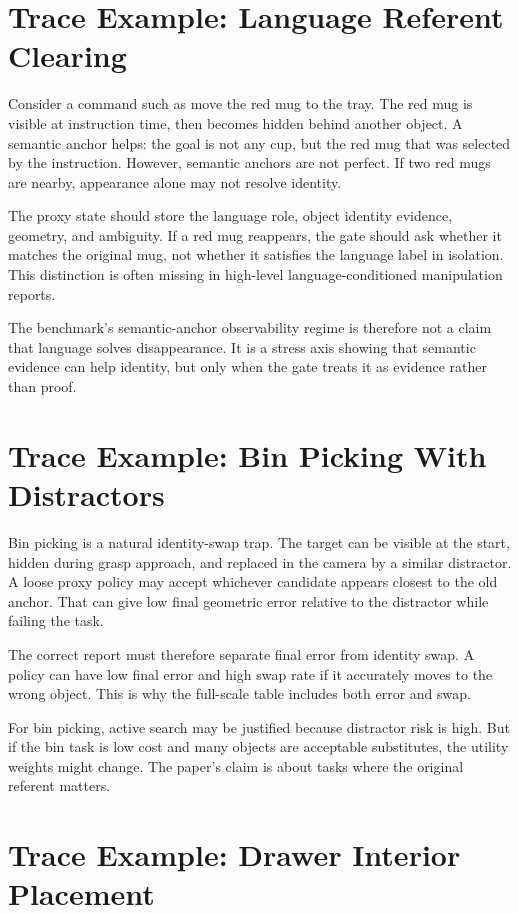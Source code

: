 \section{Trace Example: Language Referent Clearing}

Consider a command such as move the red mug to the tray. The red mug is visible at instruction time, then becomes hidden behind another object. A semantic anchor helps: the goal is not any cup, but the red mug that was selected by the instruction. However, semantic anchors are not perfect. If two red mugs are nearby, appearance alone may not resolve identity.

The proxy state should store the language role, object identity evidence, geometry, and ambiguity. If a red mug reappears, the gate should ask whether it matches the original mug, not whether it satisfies the language label in isolation. This distinction is often missing in high-level language-conditioned manipulation reports.

The benchmark's semantic-anchor observability regime is therefore not a claim that language solves disappearance. It is a stress axis showing that semantic evidence can help identity, but only when the gate treats it as evidence rather than proof.

\section{Trace Example: Bin Picking With Distractors}

Bin picking is a natural identity-swap trap. The target can be visible at the start, hidden during grasp approach, and replaced in the camera by a similar distractor. A loose proxy policy may accept whichever candidate appears closest to the old anchor. That can give low final geometric error relative to the distractor while failing the task.

The correct report must therefore separate final error from identity swap. A policy can have low final error and high swap rate if it accurately moves to the wrong object. This is why the full-scale table includes both error and swap.

For bin picking, active search may be justified because distractor risk is high. But if the bin task is low cost and many objects are acceptable substitutes, the utility weights might change. The paper's claim is about tasks where the original referent matters.

\section{Trace Example: Drawer Interior Placement}

